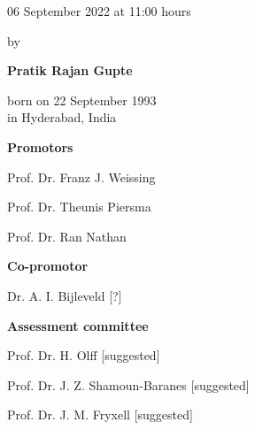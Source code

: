 \begin{titlepage}
\begin{addmargin}[-1cm]{-3cm}
\begin{center}
{            \vspace{3mm}

            06 September 2022 at 11:00 hours

            \vspace{12mm}

            by

            \vspace{12mm}

            \textbf{Pratik Rajan Gupte}

            \vspace{3mm}

            born on 22 September 1993\\
            in Hyderabad, India
        }

    \end{center}

    \pagebreak
    \thispagestyle{empty}

    \textbf{Promotors}
    \begin{description}
        \item Prof. Dr. Franz J. Weissing
        \item Prof. Dr. Theunis Piersma
        \item Prof. Dr. Ran Nathan
    \end{description}

    \vspace{6mm}

    \textbf{Co-promotor}
    \begin{description}
        \item Dr. A. I. Bijleveld [?]
    \end{description}

    \vspace{6mm}

    \textbf{Assessment committee}
    \begin{description}
        \item Prof. Dr. H. Olff [suggested]
        \item Prof. Dr. J. Z. Shamoun-Baranes [suggested]
        \item Prof. Dr. J. M. Fryxell [suggested]
    \end{description}

  \end{addmargin}

\end{titlepage}


    

